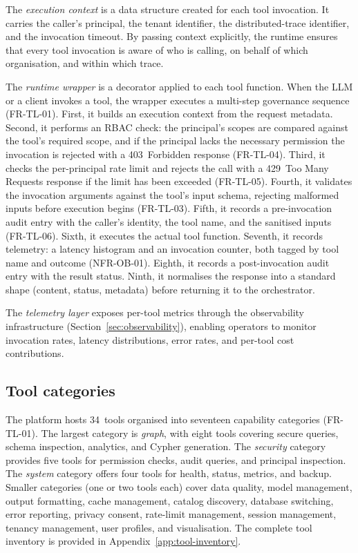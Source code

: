 \documentclass[a4paper]{sapthesis}
\begin{document}
The \emph{execution context} is a data structure created for each tool
invocation.  It carries the caller's principal, the tenant identifier, the
distributed-trace identifier, and the invocation timeout.  By passing
context explicitly, the runtime ensures that every tool invocation is
aware of who is calling, on behalf of which organisation, and within which
trace.

The \emph{runtime wrapper} is a decorator applied to each tool function.
When the LLM or a client invokes a tool, the wrapper executes a
multi-step governance sequence (FR-TL-01).  First, it builds an execution context from
the request metadata.  Second, it performs an RBAC check: the principal's
scopes are compared against the tool's required scope, and if the
principal lacks the necessary permission the invocation is rejected with a
403~Forbidden response (FR-TL-04).  Third, it checks the per-principal
rate limit and rejects the call with a 429~Too Many Requests response if
the limit has been exceeded (FR-TL-05).  Fourth, it validates the
invocation arguments against the tool's input schema, rejecting malformed
inputs before execution begins (FR-TL-03).  Fifth, it records a
pre-invocation audit entry with the caller's identity, the tool name, and
the sanitised inputs (FR-TL-06).  Sixth, it executes the actual tool
function.  Seventh, it records telemetry: a latency histogram and an
invocation counter, both tagged by tool name and outcome (NFR-OB-01).
Eighth, it records a post-invocation audit entry with the result status.
Ninth, it normalises the response into a standard shape (content, status,
metadata) before returning it to the orchestrator.

The \emph{telemetry layer} exposes per-tool metrics through the
observability infrastructure (Section~\ref{sec:observability}), enabling
operators to monitor invocation rates, latency distributions, error rates,
and per-tool cost contributions.

\subsection{Tool categories}

The platform hosts 34~tools organised into seventeen capability
categories (FR-TL-01).  The largest category is \emph{graph}, with eight
tools covering secure queries, schema inspection, analytics, and Cypher
generation.  The \emph{security} category provides five tools for
permission checks, audit queries, and principal inspection.  The
\emph{system} category offers four tools for health, status, metrics, and
backup.  Smaller categories (one or two tools each) cover data quality,
model management, output formatting, cache management, catalog discovery,
database switching, error reporting, privacy consent, rate-limit
management, session management, tenancy management, user profiles, and
visualisation.  The complete tool inventory is provided in
Appendix~\ref{app:tool-inventory}.
\end{document}
